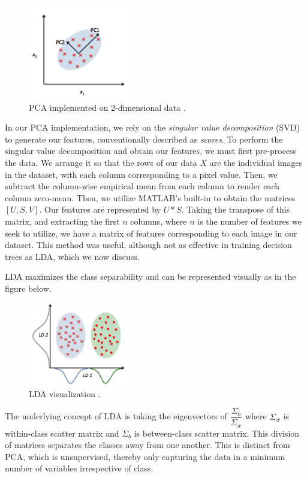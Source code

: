 	\begin{figure}[H]
		\centering\includegraphics[width=0.4\textwidth]{../images/pca}
		\caption{PCA implemented on 2-dimensional data \cite{images:ldapca}. }
	\end{figure}

        In our PCA implementation, we rely on the \emph{singular value decomposition} (SVD) to generate our features, conventionally described as \emph{scores}. To perform the singular value decomposition and obtain our features, we must first pre-process the data. We arrange it so that the rows of our data $X$ are the individual images in the dataset, with each column corresponding to a pixel value. Then, we subtract the column-wise empirical mean from each column to render each column zero-mean. Then, we utilize MATLAB's built-in  to obtain the matrices $[U, S, V]$. Our features are represented by $U*S$. Taking the transpose of this matrix, and extracting the first $n$ columns, where $n$ is the number of features we seek to utilize, we have a matrix of features corresponding to each image in our dataset. This method was useful, although not as effective in training decision trees as LDA, which we now discuss.

LDA maximizes the class separability and can be represented visually as in the figure below. 
	\begin{figure}[H]
	\centering\includegraphics[width=0.4\textwidth]{../images/lda}
	\caption{LDA visualization \cite{images:ldapca}.}
	\end{figure}
The underlying concept of LDA is taking the eigenvectors of $ \dfrac{\Sigma_b}{\Sigma_w}$ where $\Sigma_w$ is within-class scatter matrix and $\Sigma_b$ is between-class scatter matrix. This division of matrices separates the classes away from one another. This is distinct from PCA, which is unsupervised, thereby only capturing the data in a minimum number of variables irrespective of class.
